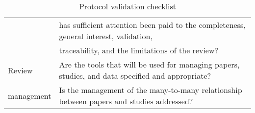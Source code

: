 \begin{table}[H]
\begin{center}
{\begin{tabular}{|l||l|}
                                & has sufficient attention been paid to the completeness, general interest, validation,      \\
                                & traceability, and the limitations of the review?                                            \\
                    \hline
                    Review      & Are the tools that will be used for managing papers, studies, and data specified and appropriate?\\
                    management  & Is the management of the many-to-many relationship between papers and studies addressed? \\
                    \hline
            \end{tabular}}
    \end{center}
    \caption{Protocol validation checklist}
    \label{table:protocolValidation}
\end{table}
